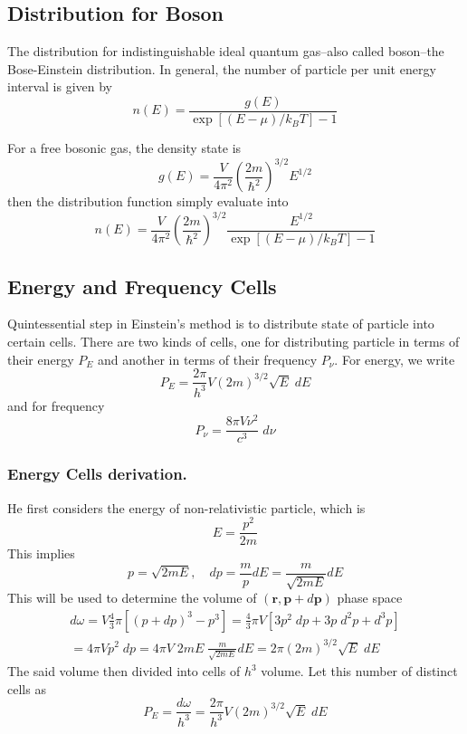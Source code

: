 \documentclass[../../../Main.tex]{subfiles}
\begin{document}
\subsection*{Distribution for Boson}
The distribution for indistinguishable ideal quantum gas--also called boson--the Bose-Einstein distribution. In general, the number of particle per unit energy interval is given by 
\begin{equation*}
    n(E)=\frac{g(E)}{\exp\left[(E-\mu)/k_BT\right]-1}
\end{equation*}

For a free bosonic gas, the density state is 
\begin{equation*}
    g(E)=\frac{V}{4\pi^2}\left(\frac{2m}{\hbar^2}\right)^{3/2}E^{1/2}
\end{equation*}
then the distribution function simply evaluate into
\begin{equation*}
    n(E)=\frac{V}{4\pi^2}\left(\frac{2m}{\hbar^2}\right)^{3/2}\frac{{E}^{1/2}}{\exp\left[(E-\mu)/k_BT\right]-1}
\end{equation*}

\subsection*{Energy and Frequency Cells}
Quintessential step in Einstein's method is to distribute state of particle into certain cells. There are two kinds of cells, one for distributing particle in terms of their energy $P_E$ and another in terms of their frequency $P_\nu$. For energy, we write
\begin{equation*}
    P_E=\frac{2\pi}{h^3}V(2m)^{3/2}\sqrt{E}\;dE
\end{equation*}
and for frequency
\begin{equation*}
    P_\nu=\frac{8\pi V\nu^2}{c^3}\;d\nu
\end{equation*}

\subsubsection*{Energy Cells derivation.} He first considers the energy of non-relativistic particle, which is 
\begin{equation*}
    E=\frac{p^2}{2m}
\end{equation*}
This implies
\begin{equation*}
    p=\sqrt{2mE},\quad dp=\frac{m}{p}dE=\frac{m}{\sqrt{2mE}}dE
\end{equation*}
This will be used to determine the volume of $(\mathbf{r},\mathbf{p}+ d\mathbf{p})$ phase space
\begin{multline*}
    d\omega=V \frac{4}{3}\pi\left[(p+dp)^3-p^3\right] = \frac{4}{3}\pi V\left[3p^2\;dp+3p\;d^2p+d^3p\right]\\
    =4\pi Vp^2\;dp =4\pi V \;2mE\;\frac{m}{\sqrt{2mE}}dE=2\pi(2m)^{3/2}\sqrt{E}\;dE
\end{multline*} 
The said volume then divided into cells of $h^3$ volume. Let this number of distinct cells as 
\begin{equation*}
    P_E=\frac{d\omega}{h^3}=\frac{2\pi}{h^3}V(2m)^{3/2}\sqrt{E}\;dE
\end{equation*}
\end{document}
